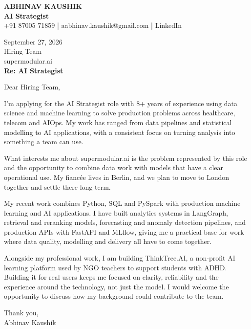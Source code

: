 \documentclass[10pt,a4paper]{article}
\begin{document}
\begin{center}
{\Large\bfseries ABHINAV KAUSHIK}\\[2pt]
{\bfseries AI Strategist}\\[2pt]
+91 87005 71859 \quad | \quad aabhinav.kaushik@gmail.com \quad | \quad LinkedIn
\end{center}
\vspace{8pt}
September 27, 2026\\[6pt]
Hiring Team\\
supermodular.ai\\[4pt]
\textbf{Re: AI Strategist}

Dear Hiring Team,

I’m applying for the AI Strategist role with 8+ years of experience using data science and machine learning to solve production problems across healthcare, telecom and AIOps. My work has ranged from data pipelines and statistical modelling to AI applications, with a consistent focus on turning analysis into something a team can use.

What interests me about supermodular.ai is the problem represented by this role and the opportunity to combine data work with models that have a clear operational use. My fiancée lives in Berlin, and we plan to move to London together and settle there long term.

My recent work combines Python, SQL and PySpark with production machine learning and AI applications. I have built analytics systems in LangGraph, retrieval and reranking models, forecasting and anomaly detection pipelines, and production APIs with FastAPI and MLflow, giving me a practical base for work where data quality, modelling and delivery all have to come together.

Alongside my professional work, I am building ThinkTree.AI, a non-profit AI learning platform used by NGO teachers to support students with ADHD. Building it for real users keeps me focused on clarity, reliability and the experience around the technology, not just the model. I would welcome the opportunity to discuss how my background could contribute to the team.

Thank you,\\
Abhinav Kaushik
\end{document}
